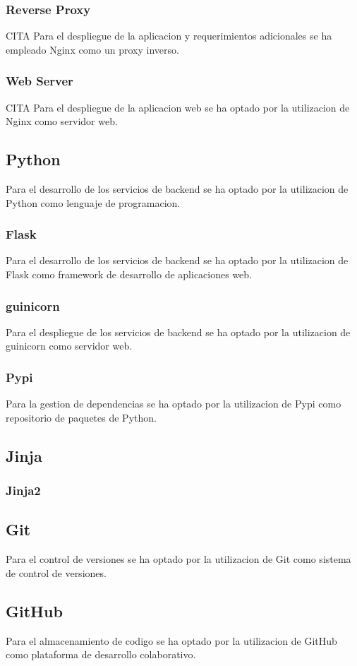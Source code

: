 \documentclass[12pt, a4paper, twoside]{article}
\begin{document}
\subsubsection{Reverse Proxy}
CITA
Para el despliegue de la aplicacion y requerimientos adicionales se ha empleado Nginx como un proxy inverso.
\subsubsection{Web Server}
CITA
Para el despliegue de la aplicacion web se ha optado por la utilizacion de Nginx como servidor web.

\subsection{Python}
Para el desarrollo de los servicios de backend se ha optado por la utilizacion de Python como lenguaje de programacion.
\subsubsection{Flask}
Para el desarrollo de los servicios de backend se ha optado por la utilizacion de Flask como framework de desarrollo de aplicaciones web.
\subsubsection{guinicorn}
Para el despliegue de los servicios de backend se ha optado por la utilizacion de guinicorn como servidor web.
\subsubsection{Pypi}
Para la gestion de dependencias se ha optado por la utilizacion de Pypi como repositorio de paquetes de Python.

\subsection{Jinja}
\subsubsection{Jinja2}


\subsection{Git}
Para el control de versiones se ha optado por la utilizacion de Git como sistema de control de versiones.
\subsection{GitHub}
Para el almacenamiento de codigo se ha optado por la utilizacion de GitHub como plataforma de desarrollo colaborativo.
\end{document}
